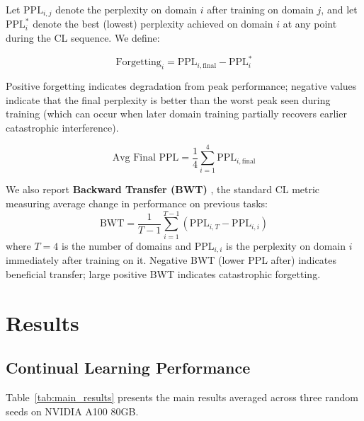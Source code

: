 \documentclass{article}
\begin{document}
Let $\text{PPL}_{i,j}$ denote the perplexity on domain $i$ after training on domain $j$, and let $\text{PPL}^*_i$ denote the best (lowest) perplexity achieved on domain $i$ at any point during the CL sequence. We define:

\begin{equation}
\text{Forgetting}_i = \text{PPL}_{i,\text{final}} - \text{PPL}^*_i
\end{equation}

Positive forgetting indicates degradation from peak performance; negative values indicate that the final perplexity is better than the worst peak seen during training (which can occur when later domain training partially recovers earlier catastrophic interference).

\begin{equation}
\text{Avg Final PPL} = \frac{1}{4} \sum_{i=1}^{4} \text{PPL}_{i,\text{final}}
\end{equation}

We also report \textbf{Backward Transfer (BWT)} \cite{lopezpaz2017gem}, the standard CL metric measuring average change in performance on previous tasks:
\begin{equation}
\text{BWT} = \frac{1}{T-1} \sum_{i=1}^{T-1} \left( \text{PPL}_{i,T} - \text{PPL}_{i,i} \right)
\end{equation}
where $T=4$ is the number of domains and $\text{PPL}_{i,i}$ is the perplexity on domain $i$ immediately after training on it. Negative BWT (lower PPL after) indicates beneficial transfer; large positive BWT indicates catastrophic forgetting.

\section{Results}

\subsection{Continual Learning Performance}

Table~\ref{tab:main_results} presents the main results averaged across three random seeds on NVIDIA A100 80GB.
\end{document}
